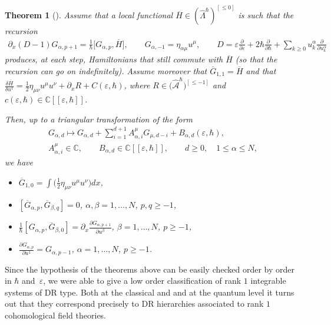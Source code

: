 \documentclass[pdftex]{sigma}
\numberwithin{equation}{section}
\newtheorem{Theorem}{Theorem}[section]
\newcommand{\mbC}{\mathbb C}
\newcommand{\hLambda}{\widehat\Lambda}
\def\d{{\partial}}
\newcommand{\<}{\left<}
\renewcommand{\>}{\right>}
\newcommand{\eps}{\varepsilon}
\newcommand{\hcA}{\widehat{\mathcal A}}
\newcommand{\oG}{{\overline G}}
\newcommand{\oH}{{\overline H}}
\begin{document}
\begin{Theorem}[\cite{BDGR16b}]\label{theorem:recursion->integrability}
Assume that a local functional $\oH \in (\hLambda^\hbar)^{[\leq 0]}$ is such that the recursion
\begin{gather*} \partial_x (D-1) G_{\alpha,p+1} = \frac{1}{\hbar}\big[ G_{\alpha,p} , \oH \big], \qquad
 G_{\alpha,-1}=\eta_{\alpha \mu} u^\mu ,\qquad D=\eps \frac{\d}{\d \eps}+2\hbar \frac{\d}{\d \hbar} + \sum_{k\geq 0} u^\alpha_k \frac{\d}{\d u^\alpha_k}\end{gather*}
produces, at each step, Hamiltonians that still commute with $\oH$ (so that the recursion can go on indefinitely). Assume moreover that $\oG_{1,1}=\oH$ and that $\frac{\delta \oH}{\delta u^1} = \frac{1}{2}\eta_{\mu \nu } u^\mu u^\nu + \d_x R+ C(\eps,\hbar)$, where $R\in \big(\hcA^\hbar\big)^{[\le -1]}$ and $c(\eps,\hbar) \in \mbC[[\eps,\hbar]]$.

Then, up to a triangular transformation of the form
\begin{gather*}G_{\alpha,d} \mapsto G_{\alpha,d} + \sum_{i=1}^{d+1} A^\mu_{\alpha, i} G_{\mu,d-i} + B_{\alpha,d}(\eps,\hbar), \\ A^\mu_{\alpha, i} \in \mbC, \qquad B_{\alpha,d} \in \mbC[[\eps,\hbar]], \qquad d\geq0, \quad 1\leq \alpha\leq N,\end{gather*}
we have
\begin{itemize}\itemsep=0pt
\item[$(i)$] $\oG_{1,0} = \int \big( \frac{1}{2}\eta_{\mu \nu } u^\mu u^\nu \big)dx$,
\item[$(ii)$] $[\oG_{\alpha,p},\oG_{\beta,q}] = 0$, $\alpha,\beta=1,\dots,N$, $p,q\geq -1$,
\item[$(iii)$] $\frac{1}{\hbar}[G_{\alpha,p},\oG_{\beta,0}] = \d_x \frac{\d G_{\alpha,p+1}}{\d u^\beta}$, $\beta=1,\dots,N$, $p\geq -1$,
\item[$(iv)$] $\frac{\d G_{\alpha,p}}{\d u^1} = G_{\alpha,p-1}$, $\alpha=1,\dots,N$, $p\geq -1$.
\end{itemize}
\end{Theorem}

Since the hypothesis of the theorems above can be easily checked order by order in $\hbar$ and~$\eps$, we were able to give a low order classif\/ication of rank $1$ integrable systems of DR type. Both at the classical and and at the quantum level it turns out that they correspond precisely to DR hierarchies associated to rank $1$ cohomological f\/ield theories.
\end{document}
